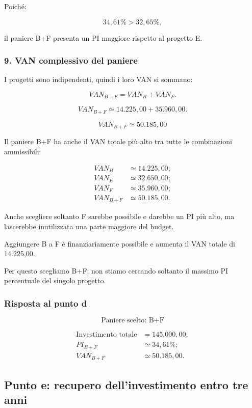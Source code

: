\noindent Poiché:

\[
34{,}61\%>32{,}65\%,
\]

\noindent il paniere B+F
presenta un PI maggiore
rispetto al progetto E.


\subsubsection*{9. VAN complessivo del paniere}

\noindent I progetti sono indipendenti,
quindi i loro VAN si sommano:

\[
VAN_{B+F}=VAN_B+VAN_F.
\]

\[
VAN_{B+F}
\simeq
14.225{,}00+35.960{,}00.
\]

\[
\boxed{
VAN_{B+F}\simeq50.185{,}00
}
\]

\noindent Il paniere B+F
ha anche il VAN totale più alto
tra tutte le combinazioni ammissibili:

\[
\begin{aligned}
VAN_B&\simeq14.225{,}00;\\
VAN_E&\simeq32.650{,}00;\\
VAN_F&\simeq35.960{,}00;\\
VAN_{B+F}&\simeq50.185{,}00.
\end{aligned}
\]

\noindent Anche scegliere soltanto F
sarebbe possibile e darebbe un PI più alto,
ma lascerebbe inutilizzata
una parte maggiore del budget.

\noindent Aggiungere B a F
è finanziariamente possibile
e aumenta il VAN totale di 14.225,00.

\noindent Per questo scegliamo B+F:
non stiamo cercando soltanto
il massimo PI percentuale
del singolo progetto.


\subsubsection*{Risposta al punto d}

\[
\boxed{
\text{Paniere scelto: B+F}
}
\]

\[
\boxed{
\begin{aligned}
\text{Investimento totale}&=145.000{,}00;\\
PI_{B+F}&\simeq34{,}61\%;\\
VAN_{B+F}&\simeq50.185{,}00.
\end{aligned}
}
\]


\subsection{Punto e:
recupero dell'investimento entro tre anni}

